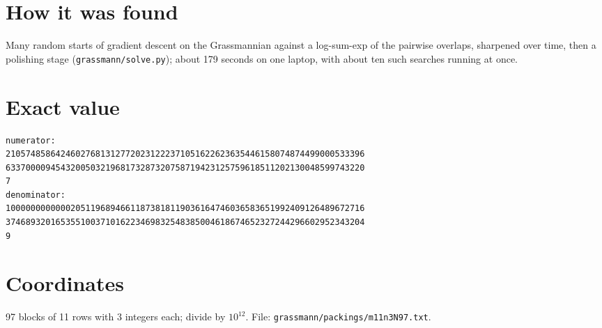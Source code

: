 \documentclass[11pt,a4paper]{article}
\begin{document}
\section{How it was found}
Many random starts of gradient descent on the Grassmannian against a log-sum-exp of the pairwise overlaps, sharpened over time, then a polishing stage (\texttt{grassmann/solve.py}); about 179 seconds on one laptop, with about ten such searches running at once.


\appendix
\section{Exact value}
{\small
\begin{verbatim}
numerator:
210574858642460276813127720231222371051622623635446158074874499000533396
633700009454320050321968173287320758719423125759618511202130048599743220
7
denominator:
100000000000020511968946611873818119036164746036583651992409126489672716
374689320165355100371016223469832548385004618674652327244296602952343204
9
\end{verbatim}}

\section{Coordinates}
97 blocks of 11 rows with 3 integers each; divide by $10^{12}$. File: \texttt{grassmann/packings/m11n3N97.txt}.
{\tiny
\begin{multicols}{3}
\end{multicols}}
\end{document}
